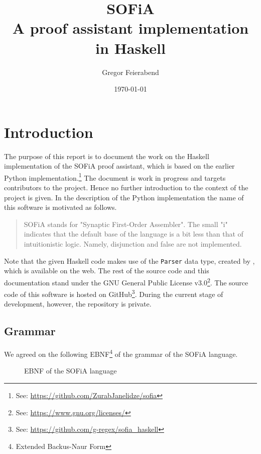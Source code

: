 \documentclass[notitlepage]{report}
\title{SOFiA\\
\large A proof assistant implementation in Haskell}
\author{Gregor Feierabend}
\date{\today}
\newcommand\m[1]{\texttt{#1}}
\begin{document}

\maketitle

\begingroup
\let\clearpage\relax
\tableofcontents
\endgroup

\chapter{Introduction}
The purpose of this report is to document the work on the Haskell
implementation of the SOFiA proof assistant, which is based on the earlier
Python implementation.\footnote{See: %
\url{https://github.com/ZurabJanelidze/sofia}}
The document is work in progress and targets contributors to the project. Hence
no further introduction to the context of the project is given. In the
description of the Python implementation the name of this software is motivated
as follows.
\begin{quote}
SOFiA stands for "Synaptic First-Order Assembler". The small "i" indicates that
the default base of the language is a bit less than that of intuitionistic
logic. Namely, disjunction and false are not implemented.
\end{quote}
Note that the given Haskell code  makes use of the \m{Parser} data type, created
by \textcite{Hutton}, which is available on the web. The rest of the source code
and this documentation stand under the GNU General Public License
v3.0\footnote{See: \url{https://www.gnu.org/licenses/}}. The source code of this
software is hosted on GitHub\footnote{See:
\url{https://github.com/g-regex/sofia_haskell}}. During the current stage of
development, however, the repository is private.


\section{Grammar}
We agreed on the following EBNF\footnote{Extended Backus-Naur Form} of the
grammar of the SOFiA language.
\begin{figure}[h!]
    {\renewcommand{\arraystretch}{2.0}
    }
    \caption{EBNF of the SOFiA language}\label{fig:EBNFsofia}
\end{figure}
\end{document}
